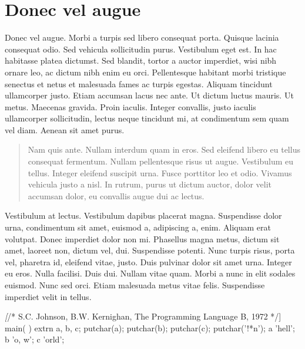 \documentclass[cfonts,nofontsdir]{nostarch}
\begin{document}
\section{Donec vel augue}


Donec vel augue. Morbi a turpis sed libero consequat
porta. Quisque lacinia consequat odio. Sed vehicula sollicitudin
purus. Vestibulum eget est. In hac habitasse platea dictumst. Sed
blandit, tortor a auctor imperdiet, wisi nibh ornare leo, ac dictum
nibh enim eu orci.  Pellentesque habitant morbi tristique senectus et
netus et malesuada fames ac turpis egestas.  Aliquam tincidunt
ullamcorper justo. Etiam accumsan lacus nec ante.  Ut dictum luctus
mauris. Ut metus. Maecenas gravida. Proin iaculis.  Integer convallis,
justo iaculis ullamcorper sollicitudin, lectus neque tincidunt mi, at
condimentum sem quam vel diam. Aenean sit amet purus.
\begin{quote}
  Nam quis ante. Nullam interdum quam in eros.  Sed eleifend libero eu
  tellus consequat fermentum. Nullam pellentesque risus ut augue.
  Vestibulum eu tellus. Integer eleifend suscipit urna. Fusce
  porttitor leo et odio. Vivamus vehicula justo a nisl. In rutrum,
  purus ut dictum auctor, dolor velit accumsan dolor, eu convallis
  augue dui ac lectus. 
\end{quote}

Vestibulum at lectus. Vestibulum dapibus placerat magna. Suspendisse
dolor urna, condimentum sit amet, euismod a, adipiscing a, enim.
Aliquam erat volutpat. Donec imperdiet dolor non mi. Phasellus magna
metus, dictum sit amet, laoreet non, dictum vel, dui. Suspendisse
potenti. Nunc turpis risus, porta vel, pharetra id,
eleifend vitae, justo. Duis pulvinar dolor sit amet urna.
Integer eu eros. Nulla facilisi. Duis dui.  Nullam vitae
quam. Morbi a nunc in elit sodales euismod.
Nunc sed orci. Etiam malesuada metus vitae
felis. Suspendisse imperdiet velit in tellus.
\begin{quotation}
\lipsum[40-41]  
\end{quotation}
\lipsum[63-65]
\begin{Code}[commandchars=\\\[\]]
\textit[/* S.C. Johnson, B.W. Kernighan, The Programming Language B, 1972 */]
main( ) {
   extrn a, b, c;
   putchar(a); putchar(b); putchar(c); putchar('!*n');
 }
 a 'hell';
 b 'o, w';
 c 'orld';  
\end{Code}
\end{document}

